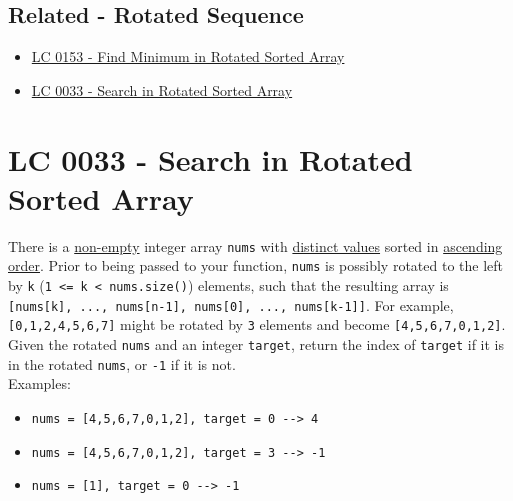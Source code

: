 \subsection*{Related - Rotated Sequence}
\begin{itemize}
\item \hyperref[lc0153]{LC 0153 - Find Minimum in Rotated Sorted Array}
\item \hyperref[lc0033]{LC 0033 - Search in Rotated Sorted Array}
\end{itemize}

\section{LC 0033 - Search in Rotated Sorted Array}\label{lc0033}
There is a \ul{non-empty} integer array {\colorbox{CodeBackground}{\lstinline|nums|}} with \ul{distinct values} sorted in \ul{ascending order}. Prior to being passed to your function, {\colorbox{CodeBackground}{\lstinline|nums|}} is possibly rotated to the left by {\colorbox{CodeBackground}{\lstinline|k|}} ({\colorbox{CodeBackground}{\lstinline|1 <= k < nums.size()|}}) elements, such that the resulting array is {\colorbox{CodeBackground}{\lstinline|[nums[k], ..., nums[n-1], nums[0], ..., nums[k-1]]|}}. For example, {\colorbox{CodeBackground}{\lstinline|[0,1,2,4,5,6,7]|}} might be rotated by {\colorbox{CodeBackground}{\lstinline|3|}} elements and become {\colorbox{CodeBackground}{\lstinline|[4,5,6,7,0,1,2]|}}.\\

Given the rotated {\colorbox{CodeBackground}{\lstinline|nums|}} and an integer {\colorbox{CodeBackground}{\lstinline|target|}}, return the index of {\colorbox{CodeBackground}{\lstinline|target|}} if it is in the rotated {\colorbox{CodeBackground}{\lstinline|nums|}}, or {\colorbox{CodeBackground}{\lstinline|-1|}} if it is not.\\

Examples:
\begin{itemize}
	\item {\colorbox{CodeBackground}{\lstinline|nums = [4,5,6,7,0,1,2], target = 0 --> 4|}}
	\item {\colorbox{CodeBackground}{\lstinline|nums = [4,5,6,7,0,1,2], target = 3 --> -1|}}
	\item {\colorbox{CodeBackground}{\lstinline|nums = [1], target = 0 --> -1|}}
\end{itemize}

